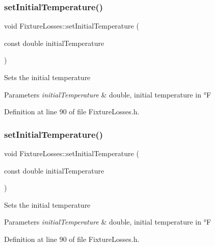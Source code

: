 \subsubsection{\texorpdfstring{set\+Initial\+Temperature()}{setInitialTemperature()}\hspace{0.1cm}{\footnotesize\ttfamily [1/3]}}
{\footnotesize\ttfamily void Fixture\+Losses\+::set\+Initial\+Temperature (\begin{DoxyParamCaption}\item[{const double}]{initial\+Temperature }\end{DoxyParamCaption})\hspace{0.3cm}{\ttfamily [inline]}}

Sets the initial temperature 
\begin{DoxyParams}{Parameters}
{\em initial\+Temperature} & double, initial temperature in °F \\
\hline
\end{DoxyParams}


Definition at line 90 of file Fixture\+Losses.\+h.

\mbox{\label{class_fixture_losses_ad3f2a1013dc5da103f2bcfc1357a449b}} 
\subsubsection{\texorpdfstring{set\+Initial\+Temperature()}{setInitialTemperature()}\hspace{0.1cm}{\footnotesize\ttfamily [2/3]}}
{\footnotesize\ttfamily void Fixture\+Losses\+::set\+Initial\+Temperature (\begin{DoxyParamCaption}\item[{const double}]{initial\+Temperature }\end{DoxyParamCaption})\hspace{0.3cm}{\ttfamily [inline]}}

Sets the initial temperature 
\begin{DoxyParams}{Parameters}
{\em initial\+Temperature} & double, initial temperature in °F \\
\hline
\end{DoxyParams}


Definition at line 90 of file Fixture\+Losses.\+h.

